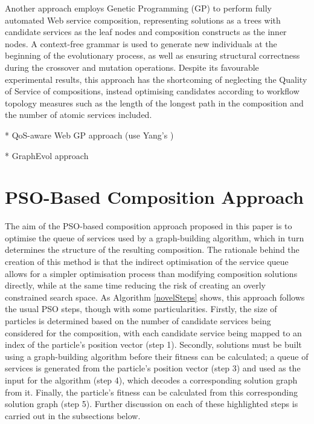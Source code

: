 \documentclass{llncs}
\begin{document}
Another approach \cite{rodriguez2010composition} employs Genetic Programming (GP) to perform fully automated Web service composition, representing solutions as a trees with candidate services as the leaf nodes and composition constructs as the inner nodes. A context-free grammar is used to generate new individuals at the beginning of the evolutionary process, as well as ensuring structural correctness during the crossover and mutation operations. Despite its favourable experimental results, this approach has the shortcoming of neglecting the Quality of Service of compositions, instead optimising candidates according to workflow topology measures such as the length of the longest path in the composition and the number of atomic services included.

* QoS-aware Web GP approach (use Yang's \cite{yu2013adaptive})

* GraphEvol approach \cite{da2015graphevol}


\section{PSO-Based Composition Approach}\label{pso_approach}
The aim of the PSO-based composition approach proposed in this paper is to optimise the queue of services used by a graph-building algorithm, which in turn determines the structure of the resulting composition. The rationale behind the creation of this method is that the indirect optimisation of the service queue allows for a simpler optimisation process than modifying composition solutions directly, while at the same time reducing the risk of creating an overly constrained search space. As Algorithm \ref{novelSteps} shows, this approach follows the usual PSO steps, though with some particularities. Firstly, the size of particles is determined based on the number of candidate services being considered for the composition, with each candidate service being mapped to an index of the particle's position vector (step 1). Secondly, solutions must be built using a graph-building algorithm before their fitness can be calculated; a queue of services is generated from the particle's position vector (step 3) and used as the input for the algorithm (step 4), which decodes a corresponding solution graph from it. Finally, the particle's fitness can be calculated from this corresponding solution graph (step 5). Further discussion on each of these highlighted steps is carried out in the subsections below.
\end{document}
